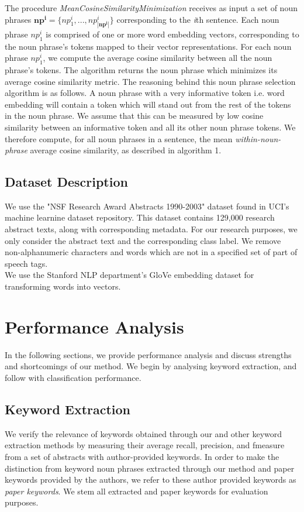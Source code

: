\documentclass[12pt]{article}
\begin{document}
The procedure \textit{MeanCosineSimilarityMinimization} receives as input a set of noun phrases
$ \mathbf{np^i} = \{np^i_1, ..., np^i_{ | \mathbf{np^i}|} \}$ corresponding to the \textit{i}th sentence. Each noun phrase $np^i_1$
is comprised of one or more word embedding vectors, corresponding to the noun phrase's tokens mapped to their vector representations.
For each noun phrase $np^i_1$, we compute the average cosine similarity between all the noun phrase's tokens. The algorithm returns the noun phrase which
minimizes its average cosine similarity metric. The reasoning behind this noun phrase selection algorithm is as follows. A noun phrase with a very informative
token i.e. word embedding will contain a token which will stand out from the rest of the tokens in the noun phrase. We assume that this can be measured
by low cosine similarity between an informative token and all its other noun phrase tokens. We therefore compute, for all noun phrases in a sentence,
the mean \textit{within-noun-phrase} average cosine similarity, as described in algorithm 1.



\subsection{Dataset Description}
We use the "NSF Research Award Abstracts 1990-2003" dataset found in UCI's machine learnine dataset repository.
This dataset contains 129,000 research abstract texts, along with corresponding metadata. For our research purposes, we only
consider the abstract text and the corresponding class label. We remove non-alphanumeric characters and words which are not in a
specified set of part of speech tags.\\

We use the Stanford NLP department's GloVe embedding dataset for transforming words into vectors.


\section{Performance Analysis}
In the following sections, we provide performance analysis and discuss strengths and shortcomings of our method. We begin by analysing keyword extraction,
and follow with classification performance.
\subsection{Keyword Extraction}
We verify the relevance of keywords obtained through our and other keyword extraction methods by measuring their average recall, precision, and fmeasure
from a set of abstracts with author-provided keywords. In order to make the distinction from keyword noun phrases extracted through our method and paper keywords
provided by the authors, we refer to these author provided keywords as \textit{paper keywords}. We stem all extracted and paper keywords for evaluation purposes.
\end{document}
